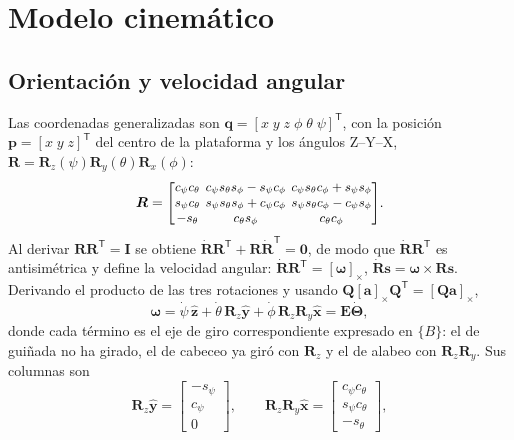 \documentclass[conference]{IEEEtran}
\newcommand{\vect}[1]{\bm{#1}}
\newcommand{\T}{^{\mathsf{T}}}
\newcommand{\sk}[1]{[#1]_{\times}}
\begin{document}
\section{Modelo cinemático}\label{sec:cinematica}

\subsection{Orientación y velocidad angular}

Las coordenadas generalizadas son $\vect q = [x\; y\; z\; \phi\; \theta\; \psi]\T$, con la posición $\vect p = [x\; y\; z]\T$ del centro de la plataforma y los ángulos Z--Y--X, $\vect R = \vect R_z(\psi)\vect R_y(\theta)\vect R_x(\phi)$:
\begin{equation}
{\setlength{\arraycolsep}{2pt}\small
\vect R = \begin{bmatrix}
c_\psi c_\theta & c_\psi s_\theta s_\phi - s_\psi c_\phi & c_\psi s_\theta c_\phi + s_\psi s_\phi\\
s_\psi c_\theta & s_\psi s_\theta s_\phi + c_\psi c_\phi & s_\psi s_\theta c_\phi - c_\psi s_\phi\\
-s_\theta & c_\theta s_\phi & c_\theta c_\phi
\end{bmatrix}}.
\end{equation}
Al derivar $\vect R\vect R\T = \vect I$ se obtiene $\dot{\vect R}\vect R\T + \vect R\dot{\vect R}\T = \vect 0$, de modo que $\dot{\vect R}\vect R\T$ es antisimétrica y define la velocidad angular: $\dot{\vect R}\vect R\T = \sk{\vect\omega}$, $\dot{\vect R}\vect s = \vect\omega\times\vect R\vect s$. Derivando el producto de las tres rotaciones y usando $\vect Q\sk{\vect a}\vect Q\T = \sk{\vect Q\vect a}$,
\begin{equation}
\vect\omega = \dot\psi\,\hat{\vect z} + \dot\theta\,\vect R_z\hat{\vect y} + \dot\phi\,\vect R_z\vect R_y\hat{\vect x} = \vect E\dot{\boldsymbol\Theta},
\end{equation}
donde cada término es el eje de giro correspondiente expresado en $\{B\}$: el de guiñada no ha girado, el de cabeceo ya giró con $\vect R_z$ y el de alabeo con $\vect R_z\vect R_y$. Sus columnas son
\begin{equation}
\vect R_z\hat{\vect y} = \begin{bmatrix}-s_\psi\\ c_\psi\\ 0\end{bmatrix},\qquad \vect R_z\vect R_y\hat{\vect x} = \begin{bmatrix}c_\psi c_\theta\\ s_\psi c_\theta\\ -s_\theta\end{bmatrix},
\end{equation}
\end{document}
